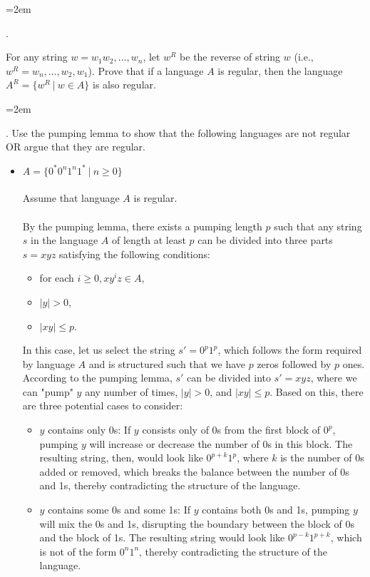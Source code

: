 \documentclass[12pt]{article}
\newcounter{quesnum}
\newcommand{\question}[2][??]{
\begin{list}{\labelitemi}{\leftmargin=2em}
\item [\arabic{quesnum}.] {} {#2}
\end{list}
\addtocounter{quesnum}{1}
}
\begin{document}
\vspace{12pt}

\question[3]{
For any string $w = w_1w_2,...,w_n$, let $w^R$ be the reverse of string $w$ (i.e., $w^R=w_n,...,w_2,w_1$). Prove that if a language $A$ is regular, then the language $A^R = \{w^R \ | \ w \in A\}$ is also regular.


}


\vspace{12pt}

\question[3]{
Use the pumping lemma to show that the following languages are not regular OR argue that they are regular. 
}

\begin{itemize}
	\item $A= \{ 0^*0^n1^n1^* \ | \ n \geq 0\}$\\
\\
Assume that language $A$ is regular.\\
\\
By the pumping lemma, there exists a pumping length $p$ such that any string $s$ in the language $A$ of length at least $p$ can be divided into three parts $s = xyz$ satisfying the following conditions:
\begin{itemize}
    \item for each $i \geq 0, xy^iz \in A$,
    \item $|y| > 0$,
    \item $|xy| \leq p$.
\end{itemize}

In this case, let us select the string $s' = 0^p1^p$, which follows the form required by language $A$ and is structured such that we have $p$ zeros followed by $p$ ones.\\

According to the pumping lemma, $s'$ can be divided into $s' = xyz$, where we can "pump" $y$ any number of times, $|y| > 0$, and $|xy| \leq p$. Based on this, there are three potential cases to consider:

\begin{itemize}
    \item $y$ contains only 0s: If $y$ consists only of 0s from the first block of $0^p$, pumping $y$ will increase or decrease the number of 0s in this block. The resulting string, then, would look like $0^{p+k}1^p$, where $k$ is the number of 0s added or removed, which breaks the balance between the number of 0s and 1s, thereby contradicting the structure of the language.
    
    \item $y$ contains some 0s and some 1s: If $y$ contains both 0s and 1s, pumping $y$ will mix the 0s and 1s, disrupting the boundary between the block of 0s and the block of 1s. The resulting string would look like $0^{p-k}1^{p+k}$, which is not of the form $0^n1^n$, thereby contradicting the structure of the language.
    

\end{itemize}
\end{itemize}
\end{document}
